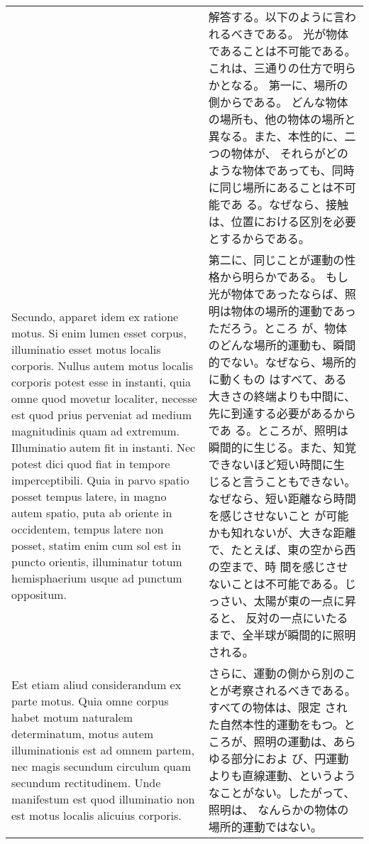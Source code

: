 \documentclass[10pt]{jsarticle} %
\begin{document}
\begin{longtable}{p{21em}p{21em}}
&

解答する。以下のように言われるべきである。
光が物体であることは不可能である。これは、三通りの仕方で明らかとなる。
第一に、場所の側からである。
どんな物体の場所も、他の物体の場所と異なる。また、本性的に、二つの物体が、
 それらがどのような物体であっても、同時に同じ場所にあることは不可能であ
 る。なぜなら、接触は、位置における区別を必要とするからである。

\\



Secundo, apparet idem ex ratione motus. Si enim lumen esset
corpus, illuminatio esset motus localis corporis. Nullus autem motus
localis corporis potest esse in instanti, quia omne quod movetur
localiter, necesse est quod prius perveniat ad medium magnitudinis quam
ad extremum. Illuminatio autem fit in instanti. Nec potest dici quod
fiat in tempore imperceptibili. Quia in parvo spatio posset tempus
latere, in magno autem spatio, puta ab oriente in occidentem, tempus
latere non posset, statim enim cum sol est in puncto orientis,
illuminatur totum hemisphaerium usque ad punctum oppositum. 


&

第二に、同じことが運動の性格から明らかである。
もし光が物体であったならば、照明は物体の場所的運動であっただろう。ところ
 が、物体のどんな場所的運動も、瞬間的でない。なぜなら、場所的に動くもの
 はすべて、ある大きさの終端よりも中間に、先に到達する必要があるからであ
 る。ところが、照明は瞬間的に生じる。また、知覚できないほど短い時間に生
 じると言うこともできない。なぜなら、短い距離なら時間を感じさせないこと
 が可能かも知れないが、大きな距離で、たとえば、東の空から西の空まで、時
 間を感じさせないことは不可能である。じっさい、太陽が東の一点に昇ると、
 反対の一点にいたるまで、全半球が瞬間的に照明される。

\\



Est etiam
aliud considerandum ex parte motus. Quia omne corpus habet motum
naturalem determinatum, motus autem illuminationis est ad omnem partem,
nec magis secundum circulum quam secundum rectitudinem. Unde manifestum
est quod illuminatio non est motus localis alicuius corporis. 


&


さらに、運動の側から別のことが考察されるべきである。すべての物体は、限定
 された自然本性的運動をもつ。ところが、照明の運動は、あらゆる部分におよ
 び、円運動よりも直線運動、というようなことがない。したがって、照明は、
 なんらかの物体の場所的運動ではない。


\end{longtable}
\end{document}
